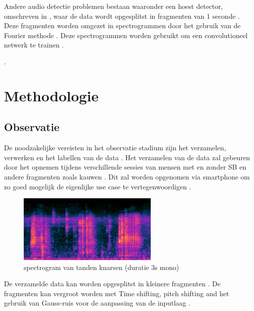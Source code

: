 \documentclass{hogent-article}
\begin{document}
\bigbreak

Andere audio detectie problemen bestaan waaronder een hoest detector, omschreven in \cite{Kvapilova_2019}, waar de data wordt opgesplitst in fragmenten van 1 seconde . Deze fragmenten worden omgezet in spectrogrammen door het gebruik van de Fourier methode . Deze spectrogrammen worden gebruikt om een convolutioneel netwerk te trainen .


.


\section{Methodologie}

\subsection{Observatie}

De noodzakelijke vereisten in het observatie stadium zijn het verzamelen, verwerken en het labellen van de data .
Het verzamelen van de data zal gebeuren door het opnemen tijdens verschillende sessies van mensen met en zonder SB en andere fragmenten zoals kauwen . Dit zal worden opgenomen via smartphone om zo goed mogelijk de eigenlijke use case te vertegenwoordigen .



\begin{figure}[h!]
    \centering
    \includegraphics[width=0.7\linewidth]{brux_spec}
    \caption{ spectrogram van tanden knarsen (duratie 3s mono)}
    \label{fig:mil spectrogram of teeth grinding (duration 3s)}
\end{figure}

De verzamelde data kan worden opgesplitst in kleinere fragmenten .
De  fragmenten kan vergroot worden met Time shifting, pitch shifting and het gebruik van Gauss-ruis voor de aanpassing van de inputlaag .
\end{document}
